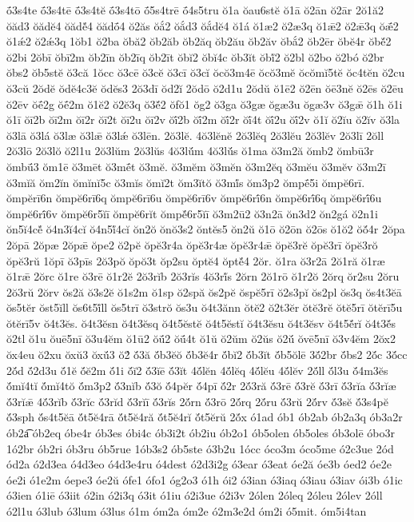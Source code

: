 {ṓ3s4te
ṓ3s4tē
ṓ3s4tĕ
ṓ3s4tō
ṓ5s4trē
ṓ4s5tru
ŏ1a
ŏau6stĕ
ŏ1ā
ŏ2ān
ŏ2ār
2ŏ1ă2
ŏăd3
ŏădĕ4
ŏădĕ́4
ŏădṓ4
ŏ2ăs
ŏắ2
ŏắd3
ŏắdĕ4
ŏ1á
ŏ1æ2
ŏ2æ3q
ŏ1ǣ2
ŏ2ǣ3q
ŏǣ́2
ŏ1ǽ2
ŏ2ǽ3q
1ŏb1
ŏ2ba
ŏbă2
ŏb2ăb
ŏb2ăq
ŏb2ău
ŏb2ăv
ŏbắ2
ŏb2ēr
ŏbĕ4r
ŏbĕ́2
ŏ2bi
2ŏbī
ŏbī2m
ŏb2īn
ŏb2īq
ŏb2īt
ŏbĭ2
ŏbĭ4c
ŏb3ĭt
ŏbĭ́2
ŏ2bl
ŏ2bo
ŏ2bó
ŏ2br
ŏbs2
ŏb5stĕ
ŏ3că
1ŏcc
ŏ3cē
ŏ3cĕ
ŏ3cī
ŏ3cĭ
ŏcŏ3m4ē
ŏcŏ3mĕ
ŏcŏmĭ5tĕ
ŏc4tĕn
ŏ2cu
ŏ3cŭ
2ŏdĕ
ŏdĕ4c3ĕ
ŏdĕs3
2ŏ3dī
ŏd2ĭ
2ŏdō
ŏ2d1u
2ŏdŭ
ŏ1ē2
ŏ2ēn
ŏē3nĕ
ŏ2ēs
ŏ2ēu
ŏ2ēv
ŏḗ2g
ŏḗ2m
ŏ1ĕ2
ŏ2ĕ3q
ŏ3ĕ́2
ŏfŏ1
ŏg2
ŏ3ga
ŏ3gæ
ŏgæ3u
ŏgæ3v
ŏ3gǣ
ŏ1h
ŏ1i
ŏ1ī
ŏī2b
ŏī2m
ŏī2r
ŏī2t
ŏī2u
ŏī2v
ŏī́2b
ŏī́2m
ŏī́2r
ŏī́4t
ŏī́2u
ŏī́2v
ŏ1ĭ
ŏ2ĭu
ŏ2ĭv
ŏ3la
ŏ3lā
ŏ3lá
ŏ3læ
ŏ3lǣ
ŏ3lǽ
ŏ3lēn.
2ŏ3lĕ.
4ŏ3lĕnĕ
2ŏ3lĕq
2ŏ3lĕu
2ŏ3lĕv
2ŏ3lī
2ŏll
2ŏ3lō
2ŏ3lŏ
ŏ2l1u
2ŏ3lŭm
2ŏ3lŭs
4ŏ3lŭ́m
4ŏ3lŭ́s
ŏ1ma
ŏ3m2ă
ŏmb2
ŏmbū3r
ŏmbū́3
ŏm1ē
ŏ3mēt
ŏ3mḗt
ŏ3mĕ.
ŏ3mĕm
ŏ3mĕn
ŏ3m2ĕq
ŏ3mĕu
ŏ3mĕv
ŏ3m2ī
ŏ3mĭă
ŏm2ĭn
ŏmĭnĭ5c
ŏ3mĭs
ŏmĭ2t
ŏm3ĭtŏ
ŏ3mĭ́s
ŏm3p2
ŏmpḗ5i
ŏmpĕ6rī.
ŏmpĕrī6n
ŏmpĕ6rī6q
ŏmpĕ6rī6u
ŏmpĕ6rī6v
ŏmpĕ6rī́6n
ŏmpĕ6rī́6q
ŏmpĕ6rī́6u
ŏmpĕ6rī́6v
ŏmpĕ6r5ĭī
ŏmpĕ6rĭt
ŏmpĕ́6r5ĭī
ŏ3m2ū2
ŏ3n2ā
ŏn3d2
ŏn2gá
ŏ2n1i
ŏn5ĭ4cĕ́
ŏ4n3ĭ4cĭ
ŏ4n5ĭ́4cĭ
ŏn2ŏ
ŏnŏ3s2
ŏntĕs5
ŏn2ŭ
ŏ1ō
ŏ2ōn
ŏ2ōs
ŏ1ŏ2
ŏŏ́4r
2ŏpa
2ŏpā
2ŏpæ
2ŏpǣ
ŏpe2
ŏ2pĕ
ŏpĕ3r4a
ŏpĕ3r4æ
ŏpĕ3r4ǣ
ŏpĕ3rĕ
ŏpĕ3rī
ŏpĕ3rŏ
ŏpĕ3rŭ
1ŏpī
ŏ3pīs
2ŏ3pŏ
ŏpŏ3t
ŏp2su
ŏptĕ4
ŏptĕ́4
2ŏr.
ŏ1ra
ŏ3r2ā
2ŏ1ră
ŏ1ræ
ŏ1rǣ
2ŏrc
ŏ1re
ŏ3rē
ŏ1r2ĕ
2ŏ3rĭb
2ŏ3rĭs
4ŏ3rĭ́s
2ŏrn
2ŏ1rō
ŏ1r2ŏ
2ŏrq
ŏr2su
2ŏru
2ŏ3rŭ
2ŏrv
ŏs2ă
ŏ3s2ĕ
ŏ1s2m
ŏ1sp
ŏ2spă
ŏs2pĕ
ŏspĕ5rī
ŏ2s3pĭ
ŏs2pl
ŏs3q
ŏs4t3ĕā
ŏs5tĕr
ŏst5ĭll
ŏs6t5ĭ́ll
ŏs5trī
ŏ3strŏ
ŏs3u
ŏ4t3ănn
ŏtĕ2
ŏ2t3ĕr
ŏtĕ3rĕ
ŏtĕ5rī
ŏtĕrī5u
ŏtĕrī5v
ŏ4t3ĕs.
ŏ4t3ĕsn
ŏ4t3ĕsq
ŏ4t5ĕstĕ
ŏ4t5ĕstĭ
ŏ4t3ĕsu
ŏ4t3ĕsv
ŏ4t5ĕ́rĭ
ŏ4t3ĕ́s
ŏ2tl
ŏ1u
ŏuē5nī
ŏ3u4ĕm
ŏ1ū2
ŏū́2
ŏū́4t
ŏ1ŭ
ŏ2ŭm
ŏ2ŭs
ŏ2ŭ́
ŏvē5nī
ŏ3v4ĕm
2ŏx2
ŏx4eu
ŏ2xu
ŏxŭ3
ŏxŭ́3
ŏ2́
ŏ́3ă
ŏ́b3ĕŏ
ŏ́b3ĕ4r
ŏ́bĭ2
ŏ́b3ĭt
ŏ́b5ŏlē
3ŏ́2br
ŏ́bs2
2ŏ́c
3ŏ́cc
2ŏ́d
ŏ́2d3u
ŏ́1ĕ
ŏ́ĕ2m
ŏ́1i
ŏ́ĭ2
ŏ́3ĭē
ŏ́3ĭt
4ŏ́lĕn
4ŏ́lĕq
4ŏ́lĕu
4ŏ́lĕv
2ŏ́ll
ŏ́l3u
ŏ́4m3ĕs
ŏ́mĭ4tĭ
ŏ́mĭ4tŏ
ŏ́m3p2
ŏ́3nĭb
ŏ́3ŏ
ŏ́4pĕr
ŏ́4pī
ŏ́2r
2ŏ́3ră
ŏ́3rē
ŏ́3rĕ
ŏ́3rī
ŏ́3rĭa
ŏ́3rĭæ
ŏ́3rĭǣ
4ŏ́3rĭb
ŏ́3rĭc
ŏ́3rĭd
ŏ́3rĭī
ŏ́3rĭs
2ŏ́rn
ŏ́3rō
2ŏ́rq
2ŏ́ru
ŏ́3rŭ
2ŏ́rv
ŏ́3sĕ
ŏ́3s4pĕ
ŏ́3sph
ŏ́s4t5ĕā
ŏ́t5ĕ4rā
ŏ́t5ĕ4ră
ŏ́t5ĕ4rĭ
ŏ́t5ĕrŭ
2ŏ́x
ó1ad
ób1
ób2ab
ób2a3q
ób3a2r
ób2a͡
ób2eq
óbe4r
ób3es
óbi4c
ób3i2t
ób2iu
ób2o1
ób5olen
ób5oles
ób3olē
óbo3r
1ó2br
ób2ri
ób3ru
ób5rue
1ób3s2
ób5ste
ó3b2u
1ócc
óco3m
óco5me
ó2c3ue
2ód
ód2a
ó2d3ea
ó4d3eo
ó4d3e4ru
ó4dest
ó2d3i2g
ó3ear
ó3eat
óe2ă
óe3b
óed2
óe2e
óe2i
ó1e2m
óepe3
óe2ŭ
ófe1
ófo1
óg2o3
ó1h
ói2
ó3ian
ó3iaq
ó3iau
ó3iav
ói3b
ó1ic
ó3ien
ó1iē
ó3iit
ó2in
ó2i3q
ó3it
ó1iu
ó2i3ue
ó2i3v
2ólen
2óleq
2óleu
2ólev
2óll
ó2l1u
ó3lub
ó3lum
ó3lus
ó1m
óm2a
óm2e
ó2m3e2d
óm2i
ó5mit.
óm5i4tan
}
